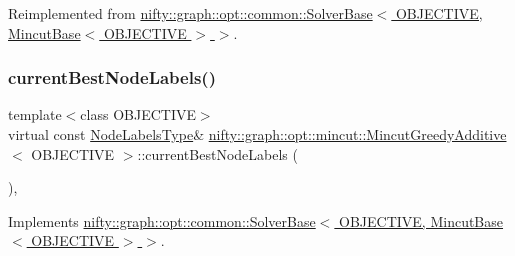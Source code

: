 Reimplemented from \hyperlink{classnifty_1_1graph_1_1opt_1_1common_1_1SolverBase_a871de6574e6189a0c97c0b2121b07155}{nifty\+::graph\+::opt\+::common\+::\+Solver\+Base$<$ O\+B\+J\+E\+C\+T\+I\+V\+E, Mincut\+Base$<$ O\+B\+J\+E\+C\+T\+I\+V\+E $>$ $>$}.

\mbox{\label{classnifty_1_1graph_1_1opt_1_1mincut_1_1MincutGreedyAdditive_a90776c1d69e006d6503007d8c870896b}} 
\subsubsection{\texorpdfstring{current\+Best\+Node\+Labels()}{currentBestNodeLabels()}}
{\footnotesize\ttfamily template$<$class O\+B\+J\+E\+C\+T\+I\+VE$>$ \\
virtual const \hyperlink{classnifty_1_1graph_1_1opt_1_1mincut_1_1MincutGreedyAdditive_a5a8855589a1e752e63650d8e678fc162}{Node\+Labels\+Type}\& \hyperlink{classnifty_1_1graph_1_1opt_1_1mincut_1_1MincutGreedyAdditive}{nifty\+::graph\+::opt\+::mincut\+::\+Mincut\+Greedy\+Additive}$<$ O\+B\+J\+E\+C\+T\+I\+VE $>$\+::current\+Best\+Node\+Labels (\begin{DoxyParamCaption}{ }\end{DoxyParamCaption})\hspace{0.3cm}{\ttfamily [inline]}, {\ttfamily [virtual]}}



Implements \hyperlink{classnifty_1_1graph_1_1opt_1_1common_1_1SolverBase_a7bbe01ee201cf3157b251e54c5ff0619}{nifty\+::graph\+::opt\+::common\+::\+Solver\+Base$<$ O\+B\+J\+E\+C\+T\+I\+V\+E, Mincut\+Base$<$ O\+B\+J\+E\+C\+T\+I\+V\+E $>$ $>$}.

\mbox{\label{classnifty_1_1graph_1_1opt_1_1mincut_1_1MincutGreedyAdditive_a2a3351733ab0dc823eb35947c92fa227}} 
